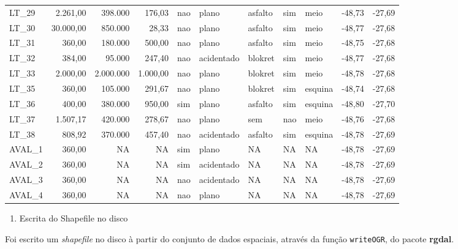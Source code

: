 \documentclass[]{article}
\providecommand{\tightlist}{%
  \setlength{\itemsep}{0pt}\setlength{\parskip}{0pt}}
\newcommand{\pkg}[1]{\textbf{#1}}
\let\code=\texttt
\begin{document}
\begin{landscape}
\begin{table}
\begin{tabular}[t]{lrrrlllllrr}
LT\_29 & 2.261,00 & 398.000 & 176,03 & nao & plano & asfalto & sim & meio & -48,73 & -27,69\\
LT\_30 & 30.000,00 & 850.000 & 28,33 & nao & plano & asfalto & sim & meio & -48,77 & -27,68\\
LT\_31 & 360,00 & 180.000 & 500,00 & nao & plano & asfalto & sim & meio & -48,75 & -27,68\\
LT\_32 & 384,00 & 95.000 & 247,40 & nao & acidentado & blokret & sim & meio & -48,77 & -27,68\\
\addlinespace
LT\_33 & 2.000,00 & 2.000.000 & 1.000,00 & nao & plano & blokret & sim & meio & -48,78 & -27,68\\
LT\_35 & 360,00 & 105.000 & 291,67 & nao & plano & blokret & sim & esquina & -48,74 & -27,68\\
LT\_36 & 400,00 & 380.000 & 950,00 & sim & plano & asfalto & sim & esquina & -48,80 & -27,70\\
LT\_37 & 1.507,17 & 420.000 & 278,67 & nao & plano & sem & nao & meio & -48,76 & -27,68\\
LT\_38 & 808,92 & 370.000 & 457,40 & nao & acidentado & asfalto & sim & esquina & -48,78 & -27,69\\
\addlinespace
AVAL\_1 & 360,00 & NA & NA & sim & plano & NA & NA & NA & -48,78 & -27,69\\
AVAL\_2 & 360,00 & NA & NA & sim & acidentado & NA & NA & NA & -48,78 & -27,69\\
AVAL\_3 & 360,00 & NA & NA & nao & acidentado & NA & NA & NA & -48,78 & -27,69\\
AVAL\_4 & 360,00 & NA & NA & nao & plano & NA & NA & NA & -48,78 & -27,69\\
\bottomrule
\end{tabular}
\end{table}
\end{landscape}

\begin{enumerate}
\def\labelenumi{\alph{enumi}.}
\setcounter{enumi}{1}
\tightlist
\item
  Escrita do Shapefile no disco
\end{enumerate}

Foi escrito um \emph{shapefile} no disco à partir do conjunto de dados
espaciais, através da função \code{writeOGR}, do pacote \pkg{rgdal}.
\end{document}
